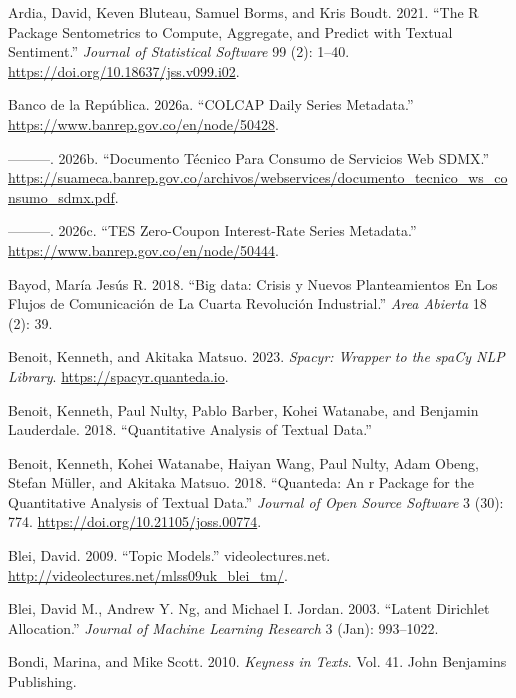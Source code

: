 \documentclass[
]{interact}
\newlength{\cslhangindent}
\newenvironment{CSLReferences}[2] %
 {\begin{list}{}{%
  \setlength{\itemindent}{0pt}
  \setlength{\leftmargin}{0pt}
  \setlength{\parsep}{0pt}
  \ifodd #1
   \setlength{\leftmargin}{\cslhangindent}
   \setlength{\itemindent}{-1\cslhangindent}
  \fi
  \setlength{\itemsep}{#2\baselineskip}}}
 {\end{list}}
\begin{document}
\label{refs}
\begin{CSLReferences}{1}{0}
Ardia, David, Keven Bluteau, Samuel Borms, and Kris Boudt. 2021. {``The
{R} Package Sentometrics to Compute, Aggregate, and Predict with Textual
Sentiment.''} \emph{Journal of Statistical Software} 99 (2): 1--40.
\url{https://doi.org/10.18637/jss.v099.i02}.

Banco de la República. 2026a. {``{COLCAP} Daily Series Metadata.''}
\url{https://www.banrep.gov.co/en/node/50428}.

---------. 2026b. {``Documento Técnico Para Consumo de Servicios Web
{SDMX}.''}
\url{https://suameca.banrep.gov.co/archivos/webservices/documento_tecnico_ws_consumo_sdmx.pdf}.

---------. 2026c. {``{TES} Zero-Coupon Interest-Rate Series Metadata.''}
\url{https://www.banrep.gov.co/en/node/50444}.

Bayod, María Jesús R. 2018. {``{Big data}: Crisis y Nuevos
Planteamientos En Los Flujos de Comunicación de La Cuarta Revolución
Industrial.''} \emph{Area Abierta} 18 (2): 39.

Benoit, Kenneth, and Akitaka Matsuo. 2023. \emph{Spacyr: Wrapper to the
spaCy NLP Library}. \url{https://spacyr.quanteda.io}.

Benoit, Kenneth, Paul Nulty, Pablo Barber, Kohei Watanabe, and Benjamin
Lauderdale. 2018. {``Quantitative Analysis of Textual Data.''}

Benoit, Kenneth, Kohei Watanabe, Haiyan Wang, Paul Nulty, Adam Obeng,
Stefan Müller, and Akitaka Matsuo. 2018. {``Quanteda: An r Package for
the Quantitative Analysis of Textual Data.''} \emph{Journal of Open
Source Software} 3 (30): 774. \url{https://doi.org/10.21105/joss.00774}.

Blei, David. 2009. {``Topic Models.''} videolectures.net.
\url{http://videolectures.net/mlss09uk_blei_tm/}.

Blei, David M., Andrew Y. Ng, and Michael I. Jordan. 2003. {``Latent
Dirichlet Allocation.''} \emph{Journal of Machine Learning Research} 3
(Jan): 993--1022.

Bondi, Marina, and Mike Scott. 2010. \emph{Keyness in Texts}. Vol. 41.
John Benjamins Publishing.


\end{CSLReferences}
\end{document}

